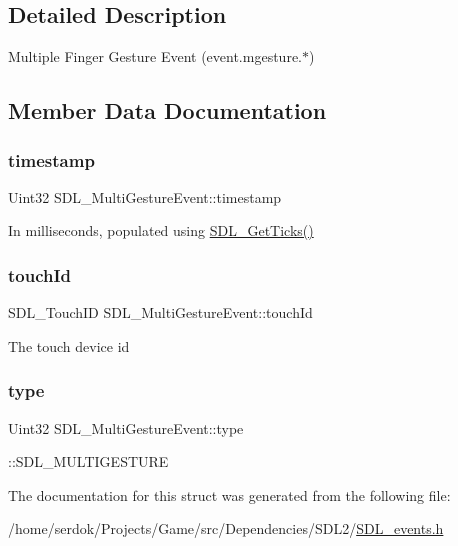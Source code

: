 \subsection{Detailed Description}
Multiple Finger Gesture Event (event.\+mgesture.$\ast$) 

\subsection{Member Data Documentation}
\mbox{\label{structSDL__MultiGestureEvent_a7e99a98debf3ce11f6d2a2fbb3637175}} 
\subsubsection{\texorpdfstring{timestamp}{timestamp}}
{\footnotesize\ttfamily Uint32 S\+D\+L\+\_\+\+Multi\+Gesture\+Event\+::timestamp}

In milliseconds, populated using \hyperlink{SDL__timer_8h_a0b9bc71d6287e0ffafdc3419760fe2b3}{S\+D\+L\+\_\+\+Get\+Ticks()} \mbox{\label{structSDL__MultiGestureEvent_aa15d1201559a3c9277082af71a972dc1}} 
\subsubsection{\texorpdfstring{touch\+Id}{touchId}}
{\footnotesize\ttfamily S\+D\+L\+\_\+\+Touch\+ID S\+D\+L\+\_\+\+Multi\+Gesture\+Event\+::touch\+Id}

The touch device id \mbox{\label{structSDL__MultiGestureEvent_ab0c7adc9a3f71cc3532bfe0ff8cc6120}} 
\subsubsection{\texorpdfstring{type}{type}}
{\footnotesize\ttfamily Uint32 S\+D\+L\+\_\+\+Multi\+Gesture\+Event\+::type}

\+::\+S\+D\+L\+\_\+\+M\+U\+L\+T\+I\+G\+E\+S\+T\+U\+RE 

The documentation for this struct was generated from the following file\+:\begin{DoxyCompactItemize}
\item 
/home/serdok/\+Projects/\+Game/src/\+Dependencies/\+S\+D\+L2/\hyperlink{SDL__events_8h}{S\+D\+L\+\_\+events.\+h}\end{DoxyCompactItemize}
